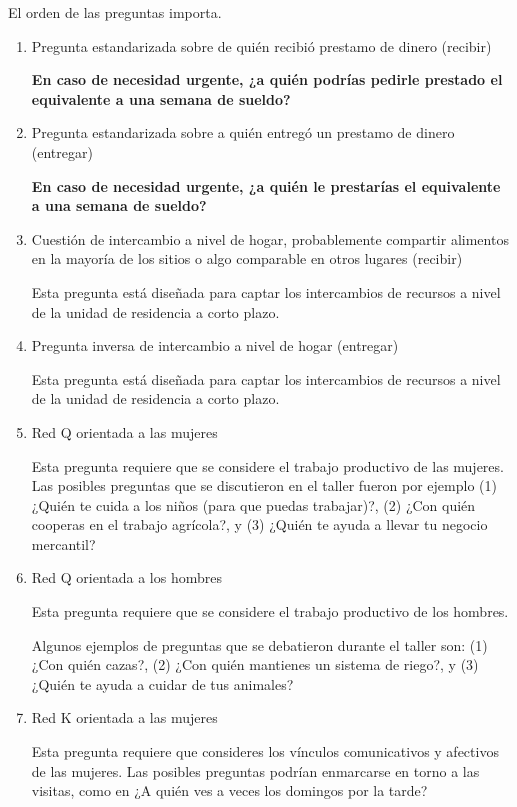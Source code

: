 \documentclass[a4paper,10pt]{article}
\theoremstyle{definition}
\begin{document}
El orden de las preguntas importa.
\begin{enumerate}
 \item Pregunta estandarizada sobre de quién recibió prestamo de dinero (recibir)
 
 \textbf{En caso de necesidad urgente, ¿a quién podrías pedirle prestado el equivalente a una semana de sueldo?}
 
 \item Pregunta estandarizada sobre a quién entregó un prestamo de dinero (entregar)
 
 \textbf{En caso de necesidad urgente, ¿a quién le prestarías el equivalente a una semana de sueldo?}
 
 \item Cuestión de intercambio a nivel de hogar, probablemente compartir alimentos en la mayoría de los sitios o algo comparable en otros lugares (recibir)
 
 Esta pregunta está diseñada para captar los intercambios de recursos a nivel de la unidad de residencia a corto plazo. 
 
 \item Pregunta inversa de intercambio a nivel de hogar (entregar)
 
 Esta pregunta está diseñada para captar los intercambios de recursos a nivel de la unidad de residencia a corto plazo. 
 
 \item Red Q orientada a las mujeres
 
 Esta pregunta requiere que se considere el trabajo productivo de las mujeres.
 Las posibles preguntas que se discutieron en el taller fueron por ejemplo (1) ¿Quién te cuida a los niños (para que puedas trabajar)?, (2) ¿Con quién cooperas en el trabajo agrícola?, y (3) ¿Quién te ayuda a llevar tu negocio mercantil?
 
 \item Red Q orientada a los hombres
 
 Esta pregunta requiere que se considere el trabajo productivo de los hombres.
 
 Algunos ejemplos de preguntas que se debatieron durante el taller son: (1) ¿Con quién cazas?, (2) ¿Con quién mantienes un sistema de riego?, y (3) ¿Quién te ayuda a cuidar de tus animales?
 
 \item Red K orientada a las mujeres
 
 Esta pregunta requiere que consideres los vínculos comunicativos y afectivos de las mujeres. 
 Las posibles preguntas podrían enmarcarse en torno a las visitas, como en ¿A quién ves a veces los domingos por la tarde? 
 

\end{enumerate}
\end{document}
